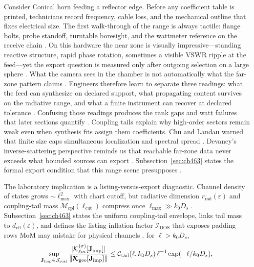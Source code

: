 \begin{physicalvignette}
Consider Conical horn feeding a reflector edge. Before any coefficient table is printed, technicians record frequency, cable loss, and the mechanical outline that fixes electrical size. The first walk-through of the range is always tactile: flange bolts, probe standoff, turntable boresight, and the wattmeter reference on the receive chain \cite{hansen1988}.
On this hardware the near zone is visually impressive---standing reactive structure, rapid phase rotation, sometimes a visible VSWR ripple at the feed---yet the export question is measured only after outgoing selection on a large sphere \cite{harrington2001}. What the camera sees in the chamber is not automatically what the far-zone pattern claims \cite{stratton1941}.
Engineers therefore learn to separate three readings: what the feed can synthesize on declared support, what propagating content survives on the radiative range, and what a finite instrument can recover at declared tolerance \cite{devaney2004}. Confusing those readings produces the rank gaps and watt failures that later sections quantify \cite{pal2026}.
Coupling tails explain why high-order sectors remain weak even when synthesis fits assign them coefficients. 
Chu and Landau warned that finite size caps simultaneous localization and spectral spread \cite{chu1948}. Devaney's inverse-scattering perspective reminds us that reachable far-zone data never exceeds what bounded sources can export \cite{devaney2004}.
Subsection~\ref{sec:ch463} states the formal export condition that this range scene presupposes \cite{stratton1941}.
\end{physicalvignette}
The laboratory implication is a listing-versus-export diagnostic. Channel density of states grows $\sim \ell_{\max}^2$ with chart cutoff, but radiative dimension $r_{\mathrm{rad}}(\varepsilon)$ and coupling-tail mass $\mathcal{M}_{\mathrm{cpl}}(\ell_{\mathrm{cut}})$ compress once $\ell_{\max}\gg k_0 D_s$ \cite{devaney2004}. Subsection~\ref{sec:ch463} states the uniform coupling-tail envelope, links tail mass to $d_{\mathrm{eff}}(\varepsilon)$, and defines the listing inflation factor $\mathcal{I}_{\mathrm{DOS}}$ that exposes padding rows MoM may mistake for physical channels \cite{hansen1988}.
for \(\ell>k_{0}D_{s}\),
\begin{equation}
\label{eq:ch4.coupling-tail-envelope}
\sup_{\mathbf{J}_{\mathrm{imp}}\in\mathcal{J}_{\mathrm{real}}}
\frac{|\mathcal{K}_{\ell m}^{(\sigma)}[\mathbf{J}_{\mathrm{imp}}]|}{\|\boldsymbol{\mathcal{K}}_{\mathrm{geo}}[\mathbf{J}_{\mathrm{imp}}]\|}
\le
\mathcal{C}_{\mathrm{tail}}(\ell,k_{0}D_{s})\,
\ell^{-1}\exp(-\ell/k_{0}D_{s}),
\end{equation}

